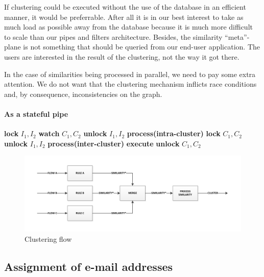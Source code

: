 If clustering could be executed without the use of the database in an efficient manner, it would be preferrable. After all it is in our best interest to take as much load as possible away from the database because it is much more difficult to scale than our pipes and filters architecture. Besides, the similarity ``meta''-plane is not something that should be queried from our end-user application. The users are interested in the result of the clustering, not the way it got there.

In the case of similarities being processed in parallel, we need to pay some extra attention. We do not want that the clustering mechanism inflicts race conditions and, by consequence, inconsistencies on the graph.


\paragraph{As a stateful pipe}

\begin{algorithm}
\caption{!!!}
\label{mincutgusfield}
\begin{algorithmic}
\STATE \textbf{lock} $I_1,I_2$
  \STATE \textbf{watch} $C_1,C_2$
  \STATE \textbf{unlock} $I_1,I_2$
  \STATE \textbf{process(intra-cluster)}
\ELSE
  \STATE \textbf{lock} $C_1,C_2$
  \STATE \textbf{unlock} $I_1,I_2$
  \STATE \textbf{process(inter-cluster)}
  \STATE \textbf{execute}
  \STATE \textbf{unlock} $C_1,C_2$
\ENDIF
\end{algorithmic}
\end{algorithm}

\begin{figure}[htbp]
	\centering
		\includegraphics[width=1\textwidth]{fig/clusteringpipe}
	\caption{Clustering flow}
	\label{fig:clusteringpipe}
\end{figure}

\subsection{Assignment of e-mail addresses}